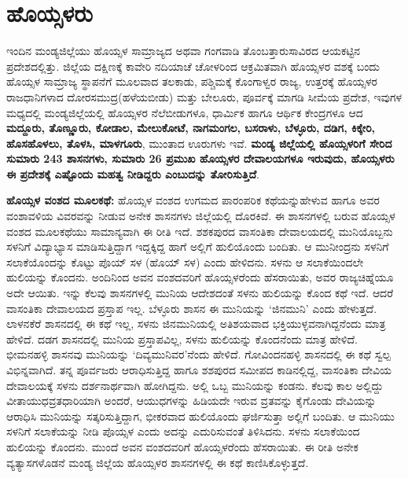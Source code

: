 \section*{ಹೊಯ್ಸಳರು}

ಇಂದಿನ ಮಂಡ್ಯಜಿಲ್ಲೆಯು ಹೊಯ್ಸಳ ಸಾಮ್ರಾಜ್ಯದ ಅಥವಾ ಗಂಗವಾಡಿ ತೊಂಬತ್ತಾರುಸಾವಿರದ ಆಯಕಟ್ಟಿನ ಪ್ರದೇಶದಲ್ಲಿತ್ತು. ಜಿಲ್ಲೆಯ ದಕ್ಷಿಣಕ್ಕೆ ಕಾವೇರಿ ನದಿಯಾಚೆ ಚೋಳರಿಂದ ಆಕ್ರಮಿತವಾಗಿ ಹೊಯ್ಸಳರ ವಶಕ್ಕೆ ಬಂದು ಹೊಯ್ಸಳ ಸಾಮ್ರಾಜ್ಯ ಸ್ಥಾಪನೆಗೆ ಮೂಲವಾದ ತಲಕಾಡು, ಪಶ್ಚಿಮಕ್ಕೆ ಕೊಂಗಾಳ್ವರ ರಾಜ್ಯ, ಉತ್ತರಕ್ಕೆ ಹೊಯ್ಸಳರ ರಾಜಧಾನಿಗಳಾದ ದೋರಸಮುದ್ರ\break (ಹಳೆಯಬೀಡು) ಮತ್ತು ಬೇಲೂರು, ಪೂರ್ವಕ್ಕೆ ಮಾಗಡಿ ಸೀಮೆಯ ಪ್ರದೇಶ, ಇವುಗಳ ಮಧ್ಯದಲ್ಲಿ ಮಂಡ್ಯಜಿಲ್ಲೆಯಲ್ಲಿ ಹೊಯ್ಸಳರ ನೆಲೆಬೀಡುಗಳೂ, ಧಾರ್ಮಿಕ ಹಾಗೂ ಆರ್ಥಿಕ ಕೇಂದ್ರಗಳೂ ಆದ \textbf{ಮದ್ದೂರು, ತೊಣ್ಣೂರು, ಕೋಡಾಲ, ಮೇಲುಕೋಟೆ, ನಾಗಮಂಗಲ, ಬಸರಾಳು, ಬೆಳ್ಳೂರು, ದಡಿಗ, ಕಿಕ್ಕೇರಿ, ಹೊಸಹೊಳಲು, ತೊಳಸಿ, ಮಾಳಗೂರು}, ಮುಂತಾದ ಊರುಗಳು ಇವೆ. \textbf{ಮಂಡ್ಯ ಜಿಲ್ಲೆಯಲ್ಲಿ ಹೊಯ್ಸಳರಿಗೆ ಸೇರಿದ ಸುಮಾರು 243 ಶಾಸನಗಳು, ಸುಮಾರು 26 ಪ್ರಮುಖ ಹೊಯ್ಸಳರ ದೇವಾಲಯಗಳೂ ಇರುವುದು, ಹೊಯ್ಸಳರು ಈ ಪ್ರದೇಶಕ್ಕೆ ಎಷ್ಟೊಂದು ಮಹತ್ವ ನೀಡಿದ್ದರು ಎಂಬುದನ್ನು ತೋರಿಸುತ್ತಿದೆ}.

\textbf{ಹೊಯ್ಸಳ ವಂಶದ ಮೂಲಕಥೆ: } ಹೊಯ್ಸಳ ವಂಶದ ಉಗಮದ ಪಾರಂಪರಿಕ ಕಥೆಯನ್ನುಹೇಳುವ ಹಾಗೂ ಅವರ ವಂಶಾವಳಿಯ ವಿವರವನ್ನು ನೀಡುವ ಅನೇಕ ಶಾಸನಗಳು ಜಿಲ್ಲೆಯಲ್ಲಿ ದೊರಕಿವೆ. ಈ ಶಾಸನಗಳಲ್ಲಿ ಬರುವ ಹೊಯ್ಸಳ ವಂಶದ ಮೂಲಕಥೆಯು ಸಾಮಾನ್ಯವಾಗಿ ಈ ರೀತಿ ಇದೆ. ಶಶಕಪುರದ ವಾಸಂತಿಕಾ ದೇವಾಲಯದಲ್ಲಿ ಮುನಿಯೊಬ್ಬನು ಸಳನಿಗೆ ವಿದ್ಯಾಭ್ಯಾಸ ಮಾಡಿಸುತ್ತಿದ್ದಾಗ ಇದ್ದಕ್ಕಿದ್ದ ಹಾಗೆ ಅಲ್ಲಿಗೆ ಹುಲಿಯೊಂದು ಬಂದಿತು. ಆ ಮುನೀಂದ್ರನು ಸಳನಿಗೆ ಸಲಾಕೆಯೊಂದನ್ನು ಕೊಟ್ಟು ಪೊಯ್​ ಸಳ (ಹೊಯ್​ ಸಳ) ಎಂದು ಹೇಳಿದನು. ಸಳನು ಆ ಸಲಾಕೆಯಿಂದಲೇ ಹುಲಿಯನ್ನು ಕೊಂದನು. ಅಂದಿನಿಂದ ಅವನ ವಂಶದವರಿಗೆ ಹೊಯ್ಸಳರೆಂದು ಹೆಸರಾಯಿತು, ಅವರ ರಾಜ್ಯಚಿಹ್ನೆಯೂ ಅದೇ ಆಯಿತು. ಇನ್ನು ಕೆಲವು ಶಾಸನಗಳಲ್ಲಿ ಮುನಿಯ ಆದೇಶದಂತೆ ಸಳನು ಹುಲಿಯನ್ನು ಕೊಂದ ಕಥೆ ಇದೆ. ಆದರೆ ವಾಸಂತಿಕಾ ದೇವಾಲಯದ ಪ್ರಸ್ತಾಪ ಇಲ್ಲ. ಬೆಳ್ಳೂರು ಶಾಸನ ಈ ಮುನಿಯನ್ನು ‘ಜಿನಮುನಿ’ ಎಂದು ಹೇಳುತ್ತದೆ. ಲಾಳನಕೆರೆ ಶಾಸನದಲ್ಲಿ ಈ ಕಥೆ ಇಲ್ಲ, ಸಳನು ಜಿನಮುನಿಯಲ್ಲಿ ಅತಿಶಯವಾದ ಭಕ್ತಿಯುಳ್ಳವನಾಗಿದ್ದನೆಂದು ಮಾತ್ರ ಹೇಳಿದೆ. ದಡಗ ಶಾಸನದಲ್ಲಿ ಮುನಿಯ ಪ್ರಸ್ತಾಪವಿಲ್ಲ, ಸಳನು ಹುಲಿಯನ್ನು ಕೊಂದನೆಂದು ಮಾತ್ರ ಹೇಳಿದೆ. ಭೀಮನಹಳ್ಳಿ ಶಾಸನವು ಮುನಿಯನ್ನು ‘ದಿವ್ಯಮುನಿವರ’ನೆಂದು ಹೇಳಿದೆ. ಗೋವಿಂದನಹಳ್ಳಿ ಶಾಸನದಲ್ಲಿ ಈ ಕಥೆ ಸ್ವಲ್ಪ ವಿಭಿನ್ನವಾಗಿದೆ. ತನ್ನ ಪೂರ್ವಜರು ಆರಾಧಿಸುತ್ತಿದ್ದ ಹಾಗೂ ಶಶಪುರದ ಸಮೀಪದ ಕಾಡಿನಲ್ಲಿದ್ದ, ವಾಸಂತಿಕಾ ದೇವಿಯ ದೇವಾಲಯಕ್ಕೆ ಸಳನು ದರ್ಶನಾರ್ಥವಾಗಿ ಹೋಗಿದ್ದನು. ಅಲ್ಲಿ ಒಬ್ಬ ಮುನಿಯನ್ನು ಕಂಡನು. ಕೆಲವು ಕಾಲ ಅಲ್ಲಿದ್ದು ವೀತಾಯುಧವ್ರತಧಾರಿಯಾಗಿ ಅಂದರೆ, ಆಯುಧಗಳನ್ನು ಹಿಡಿಯದೇ ಇರುವ ವ್ರತವನ್ನು ಕೈಗೊಂಡು ದೇವಿಯನ್ನು ಆರಾಧಿಸಿ ಮುನಿಯನ್ನು ಸತ್ಕರಿಸುತ್ತಿದ್ದಾಗ, ಭೀಕರವಾದ ಹುಲಿಯೊಂದು ಘರ್ಜಿಸುತ್ತಾ ಅಲ್ಲಿಗೆ ಬಂದಿತು. ಆ ಮುನಿಯು ಸಳನಿಗೆ ಸಲಾಕೆಯನ್ನು ನೀಡಿ ಪೊಯ್ಸಳ ಎಂದು ಅದನ್ನು ಎದುರಿಸುವಂತೆ ತಿಳಿಸಿದನು. ಸಳನು ಸಲಾಕೆಯಿಂದ ಹುಲಿಯನ್ನು ಕೊಂದನು. ಮುಂದೆ ಅವನ ವಂಶದವರಿಗೆ ಹೊಯ್ಸಳರೆಂದು ಹೆಸರಾಯಿತು. ಈ ರೀತಿ ಅನೇಕ ವ್ಯತ್ಯಾಸಗಳೊಡನೆ ಮಂಡ್ಯ ಜಿಲ್ಲೆಯ ಹೊಯ್ಸಳರ ಶಾಸನಗಳಲ್ಲಿ ಈ ಕಥೆ ಕಾಣಿಸಿಕೊಳ್ಳುತ್ತದೆ.

